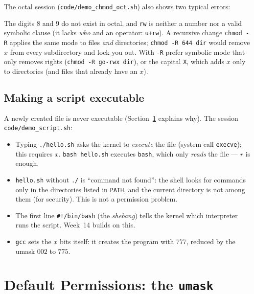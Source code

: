 \documentclass[11pt,a4paper]{article}
\newcommand{\cmd}[1]{\texttt{#1}}
\begin{document}
The octal session (\cmd{code/demo\_chmod\_oct.sh}) also shows two typical errors:



The digits $8$ and $9$ do not exist in octal, and \texttt{rw} is neither a number nor a valid symbolic clause (it lacks \emph{who} and an operator: \texttt{u+rw}). A recursive change \cmd{chmod -R} applies the same mode to files \emph{and} directories; \texttt{chmod -R 644 dir} would remove $x$ from every subdirectory and lock you out. With \texttt{-R} prefer symbolic mode that only removes rights (\texttt{chmod -R go-rwx dir}), or the capital \texttt{X}, which adds $x$ only to directories (and files that already have an $x$).

\subsection{Making a script executable}
\label{sec:script}

A newly created file is never executable (Section~\ref{sec:umask} explains why). The session \cmd{code/demo\_script.sh}:



\begin{itemize}
  \item Typing \cmd{./hello.sh} asks the kernel to \emph{execute} the file (system call \cmd{execve}); this requires $x$. \cmd{bash hello.sh} executes \cmd{bash}, which only \emph{reads} the file --- $r$ is enough.
  \item \cmd{hello.sh} without \texttt{./} is ``command not found'': the shell looks for commands only in the directories listed in \texttt{PATH}, and the current directory is not among them (for security). This is not a permission problem.
  \item The first line \texttt{\#!/bin/bash} (the \emph{shebang}) tells the kernel which interpreter runs the script. Week~14 builds on this.
  \item \cmd{gcc} sets the $x$ bits itself: it creates the program with $777$, reduced by the umask $002$ to $775$.
\end{itemize}

\section{Default Permissions: the \cmd{umask}}
\label{sec:umask}
\end{document}
